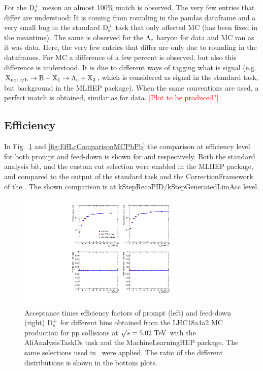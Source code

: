 For the $\rm D_s^+$ meson an almost 100\% match is observed. The very few entries that differ are understood: It is coming from rounding in the pandas dataframe and a very small bug in the standard $\rm D_s^+$ task that only affected MC (has been fixed in the meantime). The same is observed for the $\mbox{$\mathrm {\Lambda_{c}}$}$ baryon for data and MC ran as it was data. Here, the very few entries that differ are only due to rounding in the dataframes. For MC a difference of a few percent is observed, but also this difference is understood. It is due to different ways of tagging what is signal (e.g. ${\rm X}_{\rm not \, c/b} \rightarrow {\rm B} + {\rm X}_{1} \rightarrow \mbox{$\mathrm {\Lambda_{c}}$} + {\rm X}_{2}$, which is considered as signal in the standard task, but background in the MLHEP package). When the same conventions are used, a perfect match is obtained, similar as for data. \textcolor{red}{[Plot to be produced?]}

\subsection{Efficiency}
\label{subsec:effValidation}

In Fig.~\ref{fig:EffDsComparisonMCpp} and \ref{fig:EffLcComparisonMCPbPb} the comparison at efficiency level for both prompt and feed-down is shown for \Ds and \Lc respectively. Both the standard analysis bit, and the custom cut selection were enabled in the MLHEP package, and compared to the output of the standard \Ds task and the CorrectionFramework of the \Lc. The shown comparison is at kStepRecoPID/kStepGeneratedLimAcc level.

\begin{figure}[tb]
\begin{center}
\includegraphics[width=0.7\textwidth]{figures/DsEfficiencyComparison.pdf}
\caption{Acceptance times efficiency factors of prompt (left) and feed-down (right) $\rm D_s^+$ for different \pt bins obtained from the LHC18a4a2 MC production for pp collisions at $\sqrt{s}=5.02~\mathrm{TeV}$ with the AliAnalysisTaskDs task and the MachineLearningHEP package. The same selections used in~\cite{Acharya:2019mgn} were applied. The ratio of the different distributions is shown in the bottom plots.}
\label{fig:EffDsComparisonMCpp} 
\end{center}
\end{figure}

